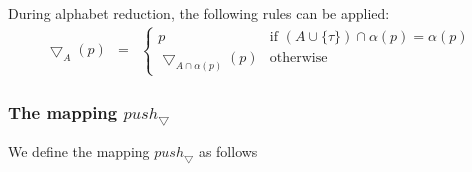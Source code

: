\documentclass{article}
\begin{document}
During alphabet reduction, the following rules can be applied:%
\[
\begin{array}{lll}
\bigtriangledown _{A}(p) & = & \left\{ 
\begin{array}{ll}
p & \text{if }(A\cup \{\tau \})\cap \alpha (p)=\alpha (p) \\ 
\bigtriangledown _{A\cap \alpha (p)}(p) & \text{otherwise}%
\end{array}%
\right.%
\end{array}%
\]%
\newpage

\subsubsection{The mapping $push_{\bigtriangledown }$}

We define the mapping $push_{\bigtriangledown }$ as follows%
\end{document}
